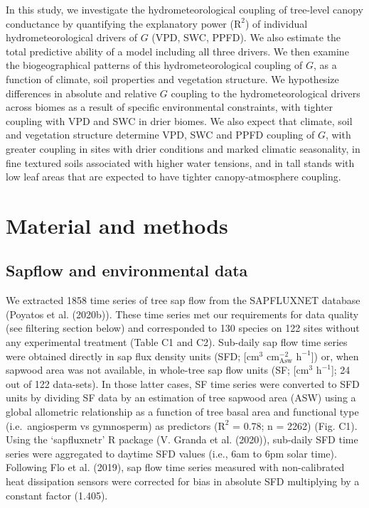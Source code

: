 \documentclass[11pt,twoside]{reedthesis}
\begin{document}
In this study, we investigate the hydrometeorological coupling of
tree-level canopy conductance by quantifying the explanatory power
(\(\text{R}^2\)) of individual hydrometeorological drivers of \(G\)
(VPD, SWC, PPFD). We also estimate the total predictive ability of a
model including all three drivers. We then examine the biogeographical
patterns of this hydrometeorological coupling of \(G\), as a function of
climate, soil properties and vegetation structure. We hypothesize
differences in absolute and relative \(G\) coupling to the
hydrometeorological drivers across biomes as a result of specific
environmental constraints, with tighter coupling with VPD and SWC in
drier biomes. We also expect that climate, soil and vegetation structure
determine VPD, SWC and PPFD coupling of \(G\), with greater coupling in
sites with drier conditions and marked climatic seasonality, in fine
textured soils associated with higher water tensions, and in tall stands
with low leaf areas that are expected to have tighter canopy-atmosphere
coupling.\par

\section{Material and methods}\label{material-and-methods}

\subsection{Sapflow and environmental
data}\label{sapflow-and-environmental-data}

We extracted 1858 time series of tree sap flow from the SAPFLUXNET
database (Poyatos et al. (2020b)). These time series met our
requirements for data quality (see filtering section below) and
corresponded to 130 species on 122 sites without any experimental
treatment (Table C1 and C2). Sub-daily sap flow time series were
obtained directly in sap flux density units (SFD; {[}\(\text{cm}^3\)
\(\text{cm}^{-2}_{\text{Asw}}\) \(\text{h}^{-1}\){]}) or, when sapwood
area was not available, in whole-tree sap flow units (SF;
{[}\(\text{cm}^3\) \(\text{h}^{-1}\){]}; 24 out of 122 data-sets). In
those latter cases, SF time series were converted to SFD units by
dividing SF data by an estimation of tree sapwood area (ASW) using a
global allometric relationship as a function of tree basal area and
functional type (i.e.~angiosperm vs gymnosperm) as predictors
(\(\text{R}^2\) = 0.78; n = 2262) (Fig. C1). Using the `sapfluxnetr' R
package (V. Granda et al. (2020)), sub-daily SFD time series were
aggregated to daytime SFD values (i.e., 6am to 6pm solar time).
Following Flo et al. (2019), sap flow time series measured with
non-calibrated heat dissipation sensors were corrected for bias in
absolute SFD multiplying by a constant factor (1.405).\par
\end{document}
